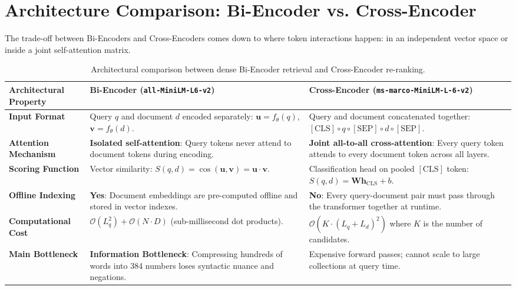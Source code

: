 \documentclass[11pt,a4paper]{article}
\begin{document}
\clearpage
\section{Architecture Comparison: Bi-Encoder vs. Cross-Encoder}

The trade-off between Bi-Encoders and Cross-Encoders comes down to where token interactions happen: in an independent vector space or inside a joint self-attention matrix.

\begin{table}[h!]
\centering
\small
\begin{tabularx}{\textwidth}{lXX}
\toprule
\textbf{Architectural Property} & \textbf{Bi-Encoder (\texttt{all-MiniLM-L6-v2})} & \textbf{Cross-Encoder (\texttt{ms-marco-MiniLM-L-6-v2})} \\
\midrule
\textbf{Input Format} & Query $q$ and document $d$ encoded separately: $\mathbf{u} = f_\theta(q)$, $\mathbf{v} = f_\theta(d)$. & Query and document concatenated together: $[\text{CLS}] \circ q \circ [\text{SEP}] \circ d \circ [\text{SEP}]$. \\
\addlinespace
\textbf{Attention Mechanism} & \textbf{Isolated self-attention}: Query tokens never attend to document tokens during encoding. & \textbf{Joint all-to-all cross-attention}: Every query token attends to every document token across all layers. \\
\addlinespace
\textbf{Scoring Function} & Vector similarity: $S(q, d) = \cos(\mathbf{u}, \mathbf{v}) = \mathbf{u} \cdot \mathbf{v}$. & Classification head on pooled $[\text{CLS}]$ token: $S(q, d) = \mathbf{W} \mathbf{h}_{\text{CLS}} + b$. \\
\addlinespace
\textbf{Offline Indexing} & \textbf{Yes}: Document embeddings are pre-computed offline and stored in vector indexes. & \textbf{No}: Every query-document pair must pass through the transformer together at runtime. \\
\addlinespace
\textbf{Computational Cost} & $\mathcal{O}(L_q^2) + \mathcal{O}(N \cdot D)$ (sub-millisecond dot products). & $\mathcal{O}(K \cdot (L_q + L_d)^2)$ where $K$ is the number of candidates. \\
\addlinespace
\textbf{Main Bottleneck} & \textbf{Information Bottleneck}: Compressing hundreds of words into 384 numbers loses syntactic nuance and negations. & Expensive forward passes; cannot scale to large collections at query time. \\
\bottomrule
\end{tabularx}
\caption{Architectural comparison between dense Bi-Encoder retrieval and Cross-Encoder re-ranking.}
\label{tab:arch_comparison}
\end{table}
\end{document}
